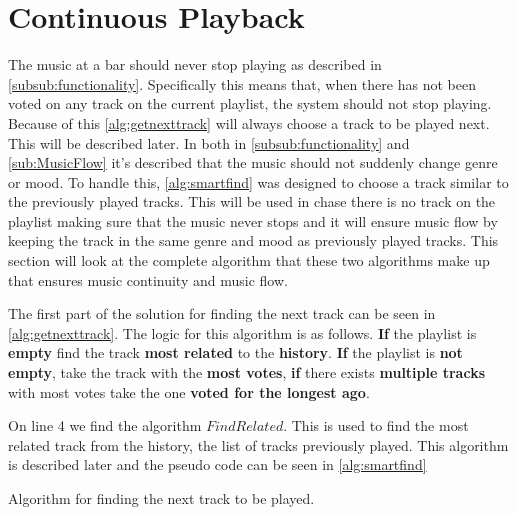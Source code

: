 \section{Continuous Playback}
\label{sec:algorithm}
The music at a bar should never stop playing as described in
\cref{subsub:functionality}. Specifically this means that, when there has not been voted
on any track on the current playlist, the system should not stop
playing. Because of this \cref{alg:getnexttrack} will always choose a track to be played next. This will be described later. In both in \cref{subsub:functionality} and \cref{sub:MusicFlow} it's described that the music should not suddenly change genre or mood. To handle this, \cref{alg:smartfind} was designed to
choose a track similar to the previously played tracks. This will be used in chase there is no track on the playlist making sure that the music never stops and it will ensure music flow by keeping the track in the same genre and mood as previously played tracks. This section will look at the complete algorithm that these two algorithms make up that ensures music continuity and music flow.

The first part of the solution for finding the next track can be seen in \cref{alg:getnexttrack}. The logic for this algorithm is as follows. \textbf{If} the playlist is \textbf{empty} find the track \textbf{most related} to the \textbf{history}. \textbf{If} the playlist is \textbf{not empty}, take the track with the \textbf{most votes}, \textbf{if} there exists \textbf{multiple tracks} with most votes take the one \textbf{voted for the longest ago}.

On line 4 we find the algorithm $FindRelated$. This is used to find the most related track from the history, the list of tracks previously played. This algorithm is described later and the pseudo code can be seen in \cref{alg:smartfind}

\begin{algorithm}[hbtp]
\caption{Algorithm for finding the next track to be played.}\label{alg:getnexttrack}
\begin{algorithmic}[1]
		\EndIf{}
			\Else{} 
					\EndIf{}
				\EndIf{}
			\EndIf{}
		\EndFor{}
	\EndFunction{}
\end{algorithmic}
\end{algorithm}

